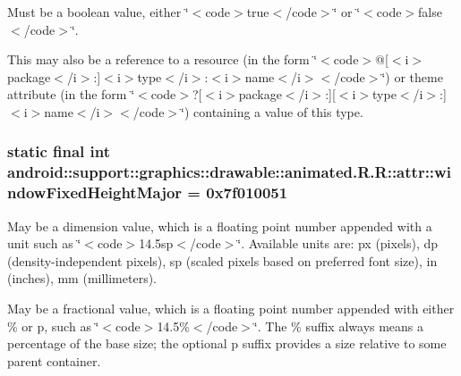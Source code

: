 Must be a boolean value, either \char`\"{}$<$code$>$true$<$/code$>$\char`\"{} or \char`\"{}$<$code$>$false$<$/code$>$\char`\"{}. 

This may also be a reference to a resource (in the form \char`\"{}$<$code$>$@\mbox{[}$<$i$>$package$<$/i$>$:\mbox{]}$<$i$>$type$<$/i$>$:$<$i$>$name$<$/i$>$$<$/code$>$\char`\"{}) or theme attribute (in the form \char`\"{}$<$code$>$?\mbox{[}$<$i$>$package$<$/i$>$:\mbox{]}\mbox{[}$<$i$>$type$<$/i$>$:\mbox{]}$<$i$>$name$<$/i$>$$<$/code$>$\char`\"{}) containing a value of this type. \hypertarget{classandroid_1_1support_1_1graphics_1_1drawable_1_1animated_1_1_r_1_1attr_5c6d70e097a807b631e0abe3fd062c89}{
\subsubsection[{windowFixedHeightMajor}]{\setlength{\rightskip}{0pt plus 5cm}static final int android::support::graphics::drawable::animated.R.R::attr::windowFixedHeightMajor = 0x7f010051}}
\label{classandroid_1_1support_1_1graphics_1_1drawable_1_1animated_1_1_r_1_1attr_5c6d70e097a807b631e0abe3fd062c89}


May be a dimension value, which is a floating point number appended with a unit such as \char`\"{}$<$code$>$14.5sp$<$/code$>$\char`\"{}. Available units are: px (pixels), dp (density-independent pixels), sp (scaled pixels based on preferred font size), in (inches), mm (millimeters). 

May be a fractional value, which is a floating point number appended with either \% or p, such as \char`\"{}$<$code$>$14.5\%$<$/code$>$\char`\"{}. The \% suffix always means a percentage of the base size; the optional p suffix provides a size relative to some parent container. 

